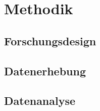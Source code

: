 
\chapter{Methodik}

\section{Forschungsdesign}

\section{Datenerhebung}

\section{Datenanalyse}







